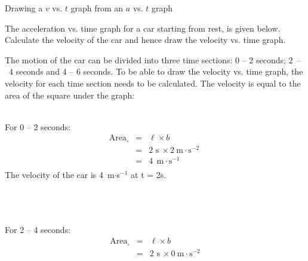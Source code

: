 \begin{wex}{Drawing a $v$ vs. $t$ graph from an $a$ vs. $t$ graph}
{The acceleration vs. time graph for a car starting from rest, is given below. Calculate the velocity of the car and hence draw the velocity vs. time graph.
\begin{center}
\end{center}}
{
The motion of the car can be divided into three time sections: 0 -- 2 seconds; 2~--~4 seconds and 4 -- 6 seconds. To be able to draw the velocity vs. time graph, the velocity for each time section needs to be calculated. The velocity is equal to the area of the square under the graph:\\
\\
\begin{minipage}{0.3\textwidth}
For 0 -- 2 seconds:
\begin{eqnarray*}
\text{Area}_{\square} &=& \ell \times b\\
&=& 2\text{~s}\ \times 2~\text{m}\cdot \text{s}^{-2}\ \\
&=&4\ ~\text{m}\cdot \text{s}^{-1}\\
\end{eqnarray*}
The velocity of the car is 4~m$\cdot$s$^{-1}$ at t = 2s.\\
\\
\\
\\
\end{minipage}
\begin{minipage}{0.03\textwidth}
\begin{center}
\end{center}
\end{minipage}
\begin{minipage}{0.3\textwidth}
For 2 -- 4 seconds:
\begin{eqnarray*}
\text{Area}_{\square} &=& \ell \times b\\
&=& 2\text{~s}\ \times 0~\text{m}\cdot \text{s}^{-2}\\

\end{eqnarray*}
\end{minipage}}
\end{wex}
